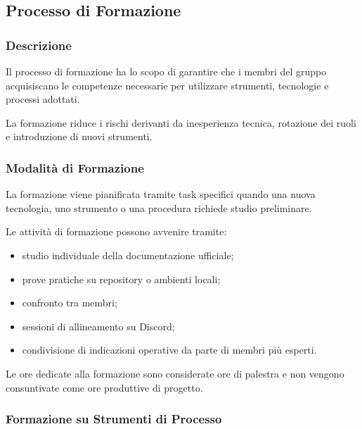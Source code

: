 
\subsection{Processo di Formazione}
\label{sec:formazione}

\subsubsection{Descrizione}

Il processo di formazione ha lo scopo di garantire che i membri del gruppo
acquisiscano le competenze necessarie per utilizzare strumenti, tecnologie e
processi adottati.

La formazione riduce i rischi derivanti da inesperienza tecnica, rotazione dei
ruoli e introduzione di nuovi strumenti.


\subsubsection{Modalità di Formazione}

La formazione viene pianificata tramite task specifici quando una nuova tecnologia,
uno strumento o una procedura richiede studio preliminare.

Le attività di formazione possono avvenire tramite:

\begin{itemize}
    \item studio individuale della documentazione ufficiale;
    \item prove pratiche su repository o ambienti locali;
    \item confronto tra membri;
    \item sessioni di allineamento su Discord;
    \item condivisione di indicazioni operative da parte di membri più esperti.
\end{itemize}

Le ore dedicate alla formazione sono considerate ore di palestra e non vengono
consuntivate come ore produttive di progetto.


\subsubsection{Formazione su Strumenti di Processo}

